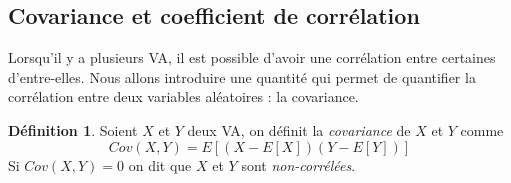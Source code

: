 \documentclass[a4paper,12pt]{report}
\theoremstyle{definition}
\renewcommand{\(}{\left(}
\renewcommand{\)}{\right)}
\renewcommand{\d}{\textit}
\newtheorem{defn}[thm]{Définition}
\begin{document}
        \subsection{Covariance et coefficient de corrélation}
        
            Lorsqu'il y a plusieurs VA, il est possible d'avoir une corrélation entre certaines d'entre-elles. Nous allons introduire une quantité qui permet de quantifier la corrélation entre deux variables aléatoires : la covariance.
            
            \begin{leftbar}
            \begin{defn}
                Soient $X$ et $Y$ deux VA, on définit la \d{covariance} de $X$ et $Y$ comme
                $$Cov(X,Y) = E[(X-E[X])(Y-E[Y])]$$
                Si $Cov(X,Y) = 0$ on dit que $X$ et $Y$ sont \d{non-corrélées}.
            \end{defn}
            \end{leftbar}
            
\end{document}
